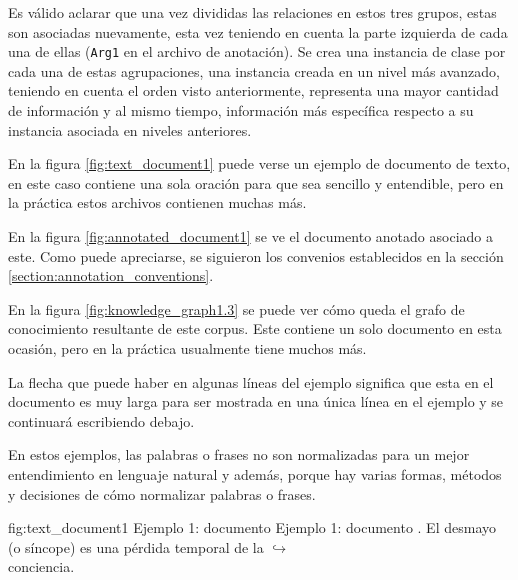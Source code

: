 Es válido aclarar que una vez divididas las relaciones en estos tres grupos, estas son asociadas nuevamente, esta vez teniendo en cuenta la parte izquierda de cada una de ellas (\texttt{Arg1} en el archivo de anotación). Se crea una instancia de clase por cada una de estas agrupaciones, una instancia creada en un nivel más avanzado, teniendo en cuenta el orden visto anteriormente, representa una mayor cantidad de información y al mismo tiempo, información más específica respecto a su instancia asociada en niveles anteriores.

En la figura \ref{fig:text_document1} puede verse un ejemplo de documento de texto, en este caso contiene una sola oración para que sea sencillo y entendible, pero en la práctica estos archivos contienen muchas más.

En la figura \ref{fig:annotated_document1} se ve el documento anotado asociado a este. Como puede apreciarse, se siguieron los convenios establecidos en la sección \ref{section:annotation_conventions}.

En la figura \ref{fig:knowledge_graph1.3} se puede ver cómo queda el grafo de conocimiento resultante de este corpus. Este contiene un solo documento en esta ocasión, pero en la práctica usualmente tiene muchos más.

La flecha que puede haber en algunas líneas del ejemplo significa que esta en el documento es muy larga para ser mostrada en una única línea en el ejemplo y se continuará escribiendo debajo.

En estos ejemplos, las palabras o frases no son normalizadas para un mejor entendimiento en lenguaje natural y además, porque hay varias formas, métodos y decisiones de cómo normalizar palabras o frases.
\begin{annexample}
[backgroundcolor=black!5]
{\textwidth}
{fig:text_document1}
{Ejemplo 1: documento }
{Ejemplo 1: documento .}
	El desmayo (o síncope) es una pérdida temporal de la {\scriptsize $\hookrightarrow$}\\
	conciencia.
\end{annexample}


